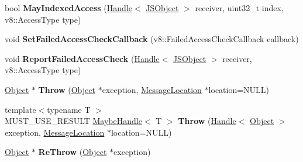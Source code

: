 \begin{DoxyCompactItemize}
\item 
\hypertarget{classv8_1_1internal_1_1_isolate_a40ebcaf514edf7d5377465ab9023aa18}{}bool {\bfseries May\+Indexed\+Access} (\hyperlink{classv8_1_1internal_1_1_handle}{Handle}$<$ \hyperlink{classv8_1_1internal_1_1_j_s_object}{J\+S\+Object} $>$ receiver, uint32\+\_\+t index, v8\+::\+Access\+Type type)\label{classv8_1_1internal_1_1_isolate_a40ebcaf514edf7d5377465ab9023aa18}

\item 
\hypertarget{classv8_1_1internal_1_1_isolate_a38513744361edd89febeaeb7bd77c2a0}{}void {\bfseries Set\+Failed\+Access\+Check\+Callback} (v8\+::\+Failed\+Access\+Check\+Callback callback)\label{classv8_1_1internal_1_1_isolate_a38513744361edd89febeaeb7bd77c2a0}

\item 
\hypertarget{classv8_1_1internal_1_1_isolate_a13f516ed5dbd4ea8d508e3f86febf04c}{}void {\bfseries Report\+Failed\+Access\+Check} (\hyperlink{classv8_1_1internal_1_1_handle}{Handle}$<$ \hyperlink{classv8_1_1internal_1_1_j_s_object}{J\+S\+Object} $>$ receiver, v8\+::\+Access\+Type type)\label{classv8_1_1internal_1_1_isolate_a13f516ed5dbd4ea8d508e3f86febf04c}

\item 
\hypertarget{classv8_1_1internal_1_1_isolate_a89faf8cf2d7ccf54daf3c837cf8b31f2}{}\hyperlink{classv8_1_1internal_1_1_object}{Object} $\ast$ {\bfseries Throw} (\hyperlink{classv8_1_1internal_1_1_object}{Object} $\ast$exception, \hyperlink{classv8_1_1internal_1_1_message_location}{Message\+Location} $\ast$location=N\+U\+L\+L)\label{classv8_1_1internal_1_1_isolate_a89faf8cf2d7ccf54daf3c837cf8b31f2}

\item 
\hypertarget{classv8_1_1internal_1_1_isolate_acd59c1e3ce445ab7e9fa463125867097}{}{\footnotesize template$<$typename T $>$ }\\M\+U\+S\+T\+\_\+\+U\+S\+E\+\_\+\+R\+E\+S\+U\+L\+T \hyperlink{classv8_1_1internal_1_1_maybe_handle}{Maybe\+Handle}$<$ T $>$ {\bfseries Throw} (\hyperlink{classv8_1_1internal_1_1_handle}{Handle}$<$ \hyperlink{classv8_1_1internal_1_1_object}{Object} $>$ exception, \hyperlink{classv8_1_1internal_1_1_message_location}{Message\+Location} $\ast$location=N\+U\+L\+L)\label{classv8_1_1internal_1_1_isolate_acd59c1e3ce445ab7e9fa463125867097}

\item 
\hypertarget{classv8_1_1internal_1_1_isolate_a6277e16778948b45994e81a6dbf08c35}{}\hyperlink{classv8_1_1internal_1_1_object}{Object} $\ast$ {\bfseries Re\+Throw} (\hyperlink{classv8_1_1internal_1_1_object}{Object} $\ast$exception)\label{classv8_1_1internal_1_1_isolate_a6277e16778948b45994e81a6dbf08c35}


\end{DoxyCompactItemize}
